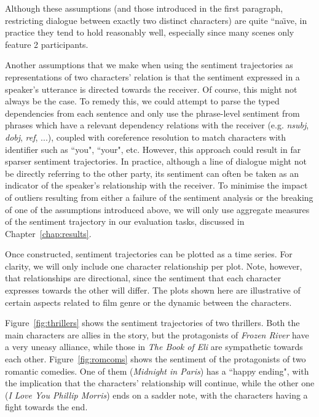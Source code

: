 \documentclass[bsc,frontabs,singlespacing,parskip, twoside]{infthesis}
\begin{document}
Although these assumptions (and those introduced in the first paragraph, restricting dialogue between exactly two distinct characters) are quite “na\"{\i}ve, in practice they tend to hold reasonably well, especially since many scenes only feature 2 participants.

Another assumptions that we make when using the sentiment trajectories as representations of two characters' relation is that the sentiment expressed in a speaker's utterance is directed towards the receiver. Of course, this might not always be the case. To remedy this, we could attempt to parse the typed dependencies from each sentence and only use the phrase-level sentiment from phrases which have a relevant dependency relations with the receiver (e.g. \textit{nsubj}, \textit{dobj}, \textit{ref}, ...), coupled with coreference resolution to match characters with identifier such as ``you", ``your", etc. However, this approach could result in far sparser sentiment trajectories. In practice, although a line of dialogue might not be directly referring to the other party, its sentiment can often be taken as an indicator of the speaker's relationship with the receiver. To minimise the impact of outliers resulting from either a failure of the sentiment analysis or the breaking of one of the assumptions introduced above, we will only use aggregate measures of the sentiment trajectory in our evaluation tasks, discussed in Chapter~\ref{chap:results}.

Once constructed, sentiment trajectories can be plotted as a time series. For clarity, we will only include one character relationship per plot. Note, however, that relationships are directional, since the sentiment that each character expresses towards the other will differ. The plots shown here are illustrative of certain aspects related to film genre or the dynamic between the characters. 

Figure~\ref{fig:thrillers} shows the sentiment trajectories of two thrillers. Both the main characters are allies in the story, but the protagonists of \textit{Frozen River} have a very uneasy alliance, while those in \textit{The Book of Eli} are sympathetic towards each other. Figure~\ref{fig:romcoms} shows the sentiment of the protagonists of two romantic  comedies. One of them (\textit{Midnight in Paris}) has a ``happy ending", with the implication that the characters' relationship will continue, while the other one (\textit{I Love You Phillip Morris}) ends on a sadder note, with the characters having a fight towards the end.
\end{document}
